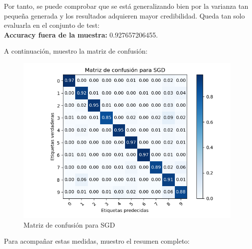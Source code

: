 Por tanto, se puede comprobar que se está generalizando bien por la varianza tan pequeña generada y los resultados adquieren mayor credibilidad. Queda tan solo evaluarla en el conjunto de test: \\

\textbf{Accuracy fuera de la muestra:} 0.927657206455.

A continuación, muestro la matriz de confusión:

\begin{figure}[H] %
	\centering
	\includegraphics[scale=0.8]{conf-m-sgd.png}  %
	\caption{Matriz de confusión para SGD} 
	\label{fig:conf-m-sgd}
\end{figure}

Para acompañar estas medidas, muestro el resumen completo:

